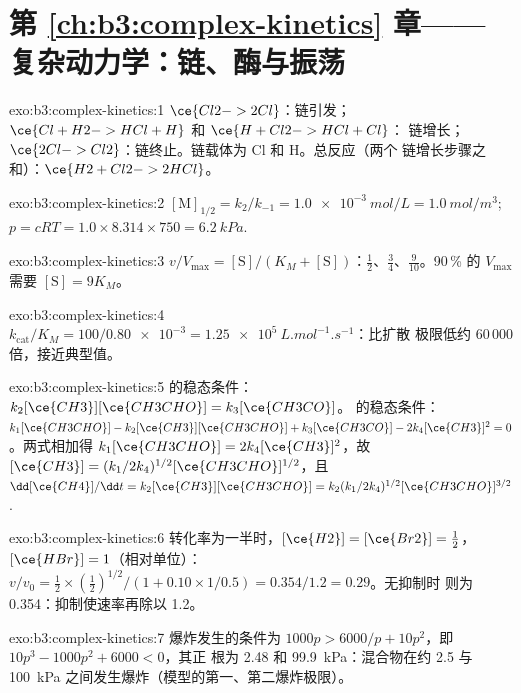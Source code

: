 \section*{第 \ref{ch:b3:complex-kinetics} 章——复杂动力学：链、酶与振荡}

\begin{solution}{exo:b3:complex-kinetics:1}
$\ce{Cl2 -> 2 Cl}$：链引发；$\ce{Cl + H2 -> HCl + H}$ 和 $\ce{H + Cl2 -> HCl + Cl}$：
链增长；$\ce{2 Cl -> Cl2}$：链终止。链载体为 Cl 和 H。总反应（两个
链增长步骤之和）：$\ce{H2 + Cl2 -> 2 HCl}$。
\end{solution}

\begin{solution}{exo:b3:complex-kinetics:2}
$[\mathrm M]_{1/2} = k_2/k_{-1} = \qty{1.0e-3}{mol/L} = \qty{1.0}{mol/m^3}$; $p = cRT = 1.0 \times 8.314 \times 750 =
\qty{6.2}{kPa}$.
\end{solution}

\begin{solution}{exo:b3:complex-kinetics:3}
$v/V_{\max} = [\mathrm S]/(K_M + [\mathrm S])$：$\frac12$、$\frac34$、$\frac{9}{10}$。90\,\% 的 $V_{\max}$ 需要 $[\mathrm S] = 9K_M$。
\end{solution}

\begin{solution}{exo:b3:complex-kinetics:4}
$k_{\mathrm{cat}}/K_M = 100/\num{0.80e-3} = \qty{1.25e5}{L.mol^{-1}.s^{-1}}$：比扩散
极限低约 60\,000 倍，接近典型值。
\end{solution}

\begin{solution}{exo:b3:complex-kinetics:5}
 的稳态条件：$k_2[\ce{CH3}][\ce{CH3CHO}] = k_3[\ce{CH3CO}]$。 的稳态条件：
$k_1[\ce{CH3CHO}] - k_2[\ce{CH3}][\ce{CH3CHO}] + k_3[\ce{CH3CO}] - 2k_4[\ce{CH3}]^2 = 0$。两式相加得 $k_1[\ce{CH3CHO}] =
2k_4[\ce{CH3}]^2$，故 $[\ce{CH3}] = (k_1/2k_4)^{1/2}[\ce{CH3CHO}]^{1/2}$，且 $\dd[\ce{CH4}]/\dd t = k_2[\ce{CH3}][\ce{CH3CHO}] =
k_2(k_1/2k_4)^{1/2}[\ce{CH3CHO}]^{3/2}$.
\end{solution}

\begin{solution}{exo:b3:complex-kinetics:6}
转化率为一半时，$[\ce{H2}] = [\ce{Br2}] = \frac12$，$[\ce{HBr}] = 1$（相对单位）：
$v/v_0 = \frac12 \times (\frac12)^{1/2}/(1 + 0.10 \times 1/0.5) = 0.354/1.2 = 0.29$。无抑制时
则为 0.354：抑制使速率再除以 1.2。
\end{solution}

\begin{solution}{exo:b3:complex-kinetics:7}
爆炸发生的条件为 $1000p > 6000/p + 10p^2$，即 $10p^3 - 1000p^2 + 6000 < 0$，其正
根为 2.48 和 \qty{99.9}{kPa}：混合物在约 2.5 与
\qty{100}{kPa} 之间发生爆炸（模型的第一、第二爆炸极限）。
\end{solution}

